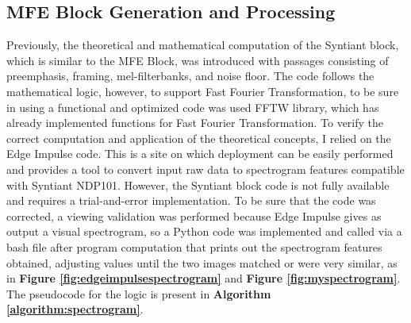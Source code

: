 \subsection{MFE Block Generation and Processing}
\label{subsec:mfe}
Previously, the theoretical and mathematical computation of the Syntiant block, which is similar to the MFE Block, was introduced with passages consisting of preemphasis, framing, mel-filterbanks, and noise floor. The code follows the mathematical logic, however, to support Fast Fourier Transformation, to be sure in using a functional and optimized code was used FFTW library, which has already implemented functions for Fast Fourier Transformation\cite{FFTW}. To verify the correct computation and application of the theoretical concepts, I relied on the Edge Impulse code\cite{edgeimpulse_processing_blocks}. This is a site on which deployment can be easily performed and provides a tool to convert input raw data to spectrogram features compatible with Syntiant NDP101. However, the Syntiant block code is not fully available and requires a trial-and-error implementation. To be sure that the code was corrected, a viewing validation was performed because Edge Impulse gives as output a visual spectrogram, so a Python code was implemented and called via a bash file after program computation that prints out the spectrogram features obtained, adjusting values until the two images matched or were very similar, as in \textbf{Figure \ref{fig:edgeimpulsespectrogram}} and \textbf{Figure \ref{fig:myspectrogram}}. The pseudocode for the logic is present in \textbf{Algorithm \ref{algorithm:spectrogram}}.
